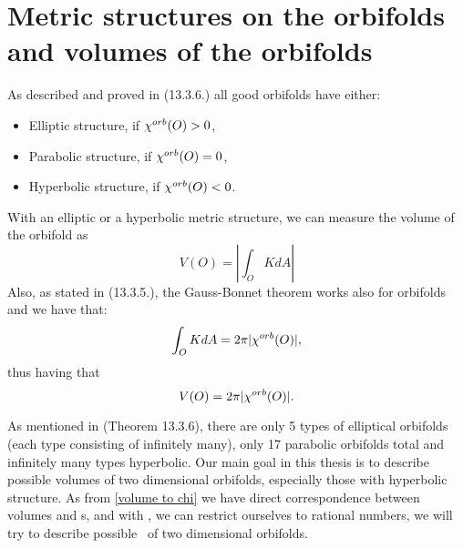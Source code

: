 
\section{Metric structures on the orbifolds and volumes of the orbifolds}
As described and proved in \cite{Thurston1979} (13.3.6.) all good orbifolds have either:
\begin{itemize}
\item Elliptic structure, if ${\chi^{orb}(O)} > 0$,
\item Parabolic structure, if ${\chi^{orb}(O)} = 0$,
\item Hyperbolic structure, if ${\chi^{orb}(O)} < 0$.
\end{itemize}
With an elliptic or a hyperbolic metric structure, we can measure the volume of the orbifold as 
\begin{equation}
V(O) = |\int_O K dA|
\end{equation} 
Also, as stated in \cite{Thurston1979} (13.3.5.), the Gauss-Bonnet 
theorem works also for orbifolds 
and we have that:
\begin{equation}
\int_O K dA = 2\pi|{\chi^{orb}(O)}|,
\end{equation}
thus having that 
\begin{equation}\label{volume to chi}
V(O) = 2\pi|{\chi^{orb}(O)}|.
\end{equation}

As mentioned in \cite{Thurston1979} (Theorem 13.3.6), there are only 5 types of elliptical 
orbifolds (each type consisting of infinitely many), 
only 17 parabolic orbifolds total and infinitely many types hyperbolic. 
Our main goal in this thesis is to describe possible volumes of two dimensional orbifolds, 
especially those with hyperbolic structure. 
As from \ref{volume to chi} we have direct correspondence 
between volumes and \Eoc s, and with \Eoc, we can restrict ourselves to rational numbers, 
we will try to describe possible \Eoc\ of two dimensional orbifolds.  

